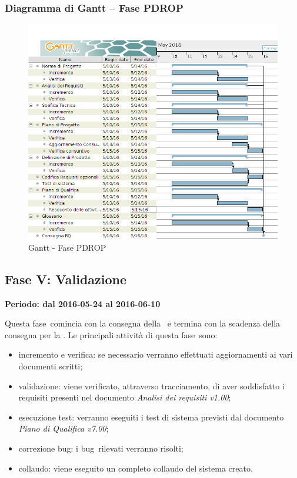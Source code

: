 \documentclass[../PianoProgetto.tex]{subfiles}
\begin{document}
		
		\subsubsection{Diagramma di Gantt – Fase PDROP}
			\begin{figure}[!h]
				\centering
				\includegraphics[width=\textwidth]{gantt_png/6-requisiti_facoltativi}
				\caption{Gantt - Fase PDROP}
				\label{fig:Gantt - Fase PDROP}
			\end{figure}
			
\newpage
	\subsection{Fase V: Validazione}
		\textbf{Periodo: dal 2016-05-24 al 2016-06-10}
		
		Questa fase\g\ comincia con la consegna della \revisionediqualifica\ e termina con la scadenza della consegna per la \revisionediaccettazione . Le principali attività di questa fase\g\ sono:

		\begin{itemize}
		
				\item incremento e verifica: se necessario verranno effettuati aggiornamenti ai vari documenti scritti;

				\item validazione: viene verificato, attraverso tracciamento, di aver soddisfatto i requisiti presenti nel documento \textit{Analisi dei requisiti v1.00};

				\item esecuzione test: verranno eseguiti i test di sistema previsti dal documento \textit{Piano di Qualifica v7.00};

				\item correzione bug\g : i bug\g\ rilevati verranno risolti;

				\item collaudo: viene eseguito un completo collaudo del sistema creato.
		\end{itemize}
		
\end{document}

